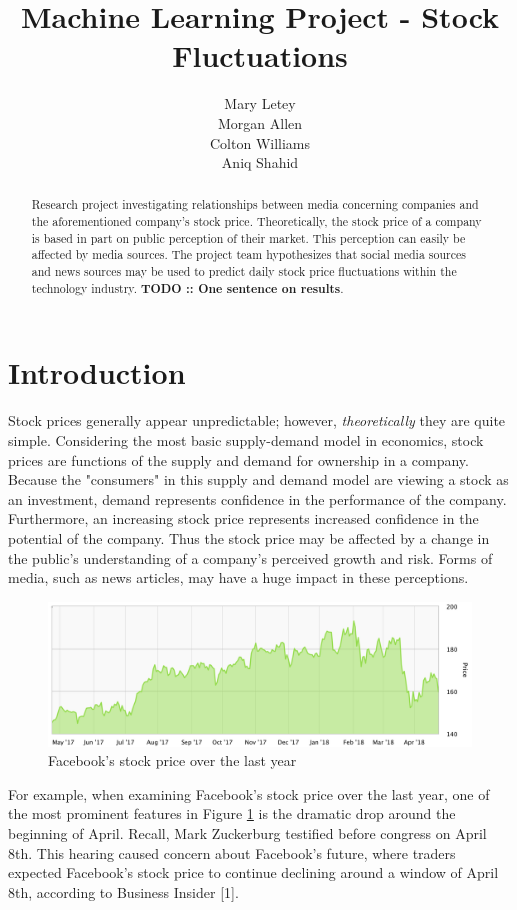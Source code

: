 \documentclass{article}
\title{Machine Learning Project - Stock Fluctuations}
\author{
  Mary Letey \\
  \And
  Morgan Allen \\
  \And
  Colton Williams \\
  \And
  Aniq Shahid 
}
\begin{document}
\maketitle

\begin{abstract}
  Research project investigating relationships between media concerning companies and the aforementioned company's stock price. Theoretically, the stock price of a company is based in part on public perception of their market. This perception can easily be affected by media sources. The project team hypothesizes that social media sources and news sources may be used to predict daily stock price fluctuations within the technology industry. \textbf{TODO :: One sentence on results}.
\end{abstract}
 
\section{Introduction}

Stock prices generally appear unpredictable; however, \emph{theoretically} they are quite simple. Considering the most basic supply-demand model in economics, stock prices are functions of the supply and demand for ownership in a company. Because the "consumers" in this supply and demand model are viewing a stock as an investment, demand represents confidence in the performance of the company. Furthermore, an increasing stock price represents increased confidence in the potential of the company. Thus the stock price may be affected by a change in the public's understanding of a company's perceived growth and risk. Forms of media, such as news articles, may have a huge impact in these perceptions.

\begin{figure}[h]
    \includegraphics[scale=0.5]{FacebookYear.png}
  \caption{Facebook's stock price over the last year}
  \label{fig:faceplant}
\end{figure}

For example, when examining Facebook's stock price over the last year, one of the most prominent features in Figure \ref{fig:faceplant} is the dramatic drop around the beginning of April. Recall, Mark Zuckerburg testified before congress on April 8th. This hearing caused concern about Facebook's future, where traders expected Facebook's stock price to continue declining around a window of April 8th, according to Business Insider [1].
\end{document}
